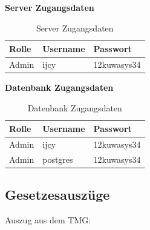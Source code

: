 \documentclass[12pt, twoside, a4paper, ngerman]{article}
\begin{document}
\begin{appendix}
\textbf{Server Zugangsdaten}

\begin{table}[H]
\begin{center}
	\begin{tabular}{|l|l|l||}\hline
		\textbf{Rolle} & \textbf{Username} & \textbf{Passwort} \\ \hline
		Admin & ijcy & 12kuwasys34 \\ \hline \hline
	\end{tabular}
	\caption{Server Zugangsdaten}
\end{center}
\end{table}

\textbf{Datenbank Zugangsdaten}

\begin{table}[H]
\begin{center}
	\begin{tabular}{|l|l|l||}\hline
		\textbf{Rolle} & \textbf{Username} & \textbf{Passwort} \\ \hline
		Admin & ijcy & 12kuwasys34 \\ \hline
		Admin & postgres & 12kuwasys34 \\ \hline \hline
	\end{tabular}
	\caption{Datenbank Zugangsdaten}
\end{center}
\end{table}

\subsection{Gesetzesauszüge}\label{subsec:Gesetz}

Auszug aus dem \ac{TMG}:


\end{appendix}
\end{document}
